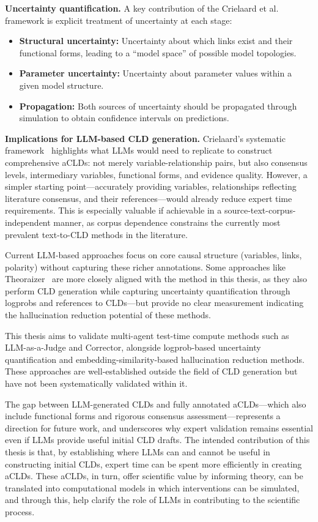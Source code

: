 \medskip
\noindent
\textbf{Uncertainty quantification.} A key contribution of the Crielaard et al. framework is explicit treatment of uncertainty at each stage:
\begin{itemize}
    \item \textbf{Structural uncertainty:} Uncertainty about which links exist and their functional forms, leading to a ``model space'' of possible model topologies.
    \item \textbf{Parameter uncertainty:} Uncertainty about parameter values within a given model structure.
    \item \textbf{Propagation:} Both sources of uncertainty should be propagated through simulation to obtain confidence intervals on predictions.
\end{itemize}

\medskip
\noindent
\textbf{Implications for LLM-based CLD generation.} Crielaard's systematic framework~\citep{crielaard2024refining} highlights what LLMs would need to replicate to construct comprehensive aCLDs: not merely variable-relationship pairs, but also consensus levels, intermediary variables, functional forms, and evidence quality. However, a simpler starting point---accurately providing variables, relationships reflecting literature consensus, and their references---would already reduce expert time requirements. This is especially valuable if achievable in a source-text-corpus-independent manner, as corpus dependence constrains the currently most prevalent text-to-CLD methods in the literature.

Current LLM-based approaches focus on core causal structure (variables, links, polarity) without capturing these richer annotations. Some approaches like Theoraizer~\citep{Waaijers2024theoraizer} are more closely aligned with the method in this thesis, as they also perform CLD generation while capturing uncertainty quantification through logprobs and references to CLDs---but provide no clear measurement indicating the hallucination reduction potential of these methods.

This thesis aims to validate multi-agent test-time compute methods such as LLM-as-a-Judge and Corrector, alongside logprob-based uncertainty quantification and embedding-similarity-based hallucination reduction methods. These approaches are well-established outside the field of CLD generation but have not been systematically validated within it.

The gap between LLM-generated CLDs and fully annotated aCLDs---which also include functional forms and rigorous consensus assessment---represents a direction for future work, and underscores why expert validation remains essential even if LLMs provide useful initial CLD drafts. The intended contribution of this thesis is that, by establishing where LLMs can and cannot be useful in constructing initial CLDs, expert time can be spent more efficiently in creating aCLDs. These aCLDs, in turn, offer scientific value by informing theory, can be translated into computational models in which interventions can be simulated, and through this, help clarify the role of LLMs in contributing to the scientific process.

